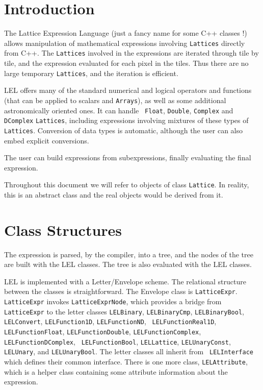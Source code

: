 \section{Introduction}

The Lattice Expression Language (just a fancy name for some C++ classes !)
allows manipulation of mathematical expressions involving {\tt Lattices}
directly from C++.  The {\tt Lattices} involved in the expressions are
iterated through tile by tile, and the expression evaluated for each
pixel in the tiles.  Thus there are no large temporary {\tt Lattices}, and the
iteration is efficient.   

LEL offers many of the standard numerical and logical operators and
functions (that can be applied to scalars and {\tt Arrays}), as well as
some additional astronomically oriented ones.  It can handle {\tt
Float}, {\tt Double}, {\tt Complex} and {\tt DComplex} {\tt Lattices},
including expressions involving mixtures of these types of {\tt
Lattices}.  Conversion of data types is automatic, although the user can
also embed explicit conversions. 

The user can build expressions from subexpressions, finally evaluating
the final expression.  

Throughout this document we will refer to objects of class
{\tt Lattice}.  In reality, this is an abstract class and
the real objects would be derived from it.

\section {Class Structures}

The expression is parsed, by the compiler, into a tree, and the nodes of
the tree are built with the LEL classes.  The tree is also evaluated
with the LEL classes. 

LEL is implemented with a Letter/Envelope scheme.  The relational
structure between the classes is straightforward.  The Envelope class is
{\tt LatticeExpr}.  {\tt LatticeExpr} invokes {\tt LatticeExprNode},
which provides a bridge from {\tt LatticeExpr} to the letter classes
{\tt LELBinary}, {\tt LELBinaryCmp}, {\tt LELBinaryBool}, {\tt
LELConvert}, {\tt LELFunction1D}, {\tt LELFunctionND}, {\tt
LELFunctionReal1D}, {\tt LELFunctionFloat}, {\tt LELFunctionDouble},
{\tt LELFunctionComplex}, {\tt LELFunctionDComplex}, {\tt
LELFunctionBool}, {\tt LELLattice}, {\tt LELUnaryConst}, {\tt LELUnary},
and {\tt LELUnaryBool}.  The letter classes all inherit from {\tt
LELInterface} which defines their common interface.  There is one more
class, {\tt LELAttribute}, which is a helper class containing some
attribute information about the expression. 
 
